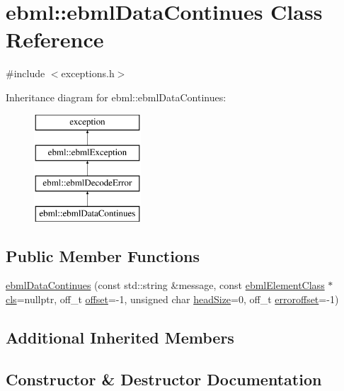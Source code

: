 \hypertarget{classebml_1_1ebmlDataContinues}{}\section{ebml\+:\+:ebml\+Data\+Continues Class Reference}
\label{classebml_1_1ebmlDataContinues}


{\ttfamily \#include $<$exceptions.\+h$>$}

Inheritance diagram for ebml\+:\+:ebml\+Data\+Continues\+:\begin{figure}[H]
\begin{center}
\leavevmode
\includegraphics[height=4.000000cm]{classebml_1_1ebmlDataContinues}
\end{center}
\end{figure}
\subsection*{Public Member Functions}
\begin{DoxyCompactItemize}
\item 
\mbox{\hyperlink{classebml_1_1ebmlDataContinues_acc954c94b4650ccfa1513c5469e845c9}{ebml\+Data\+Continues}} (const std\+::string \&message, const \mbox{\hyperlink{classebml_1_1ebmlElementClass}{ebml\+Element\+Class}} $\ast$\mbox{\hyperlink{classebml_1_1ebmlDecodeError_a3568b4ea3cd5bd16b9510abfe269920f}{cls}}=nullptr, off\+\_\+t \mbox{\hyperlink{classebml_1_1ebmlDecodeError_ad32ac9b3dd52f1c11479085d9c665e0f}{offset}}=-\/1, unsigned char \mbox{\hyperlink{classebml_1_1ebmlDecodeError_a61a4d4856f0c779a1c216e45dc5a7c1e}{head\+Size}}=0, off\+\_\+t \mbox{\hyperlink{classebml_1_1ebmlDecodeError_acb525117e0109d9640fb5e8c546e9a02}{erroroffset}}=-\/1)
\end{DoxyCompactItemize}
\subsection*{Additional Inherited Members}


\subsection{Constructor \& Destructor Documentation}
\mbox{\label{classebml_1_1ebmlDataContinues_acc954c94b4650ccfa1513c5469e845c9}} 
